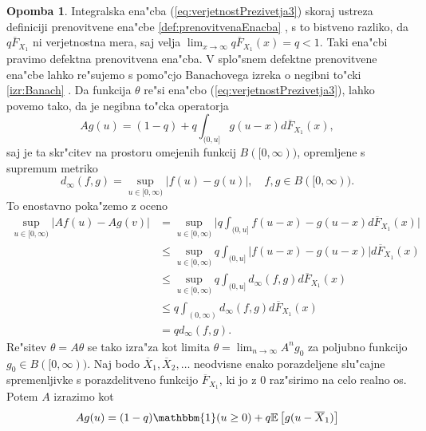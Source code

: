 \documentclass[12pt, a4paper, reqno]{amsart}
\theoremstyle{definition}
\newtheorem{opomba}[definicija]{Opomba}
\theoremstyle{plain}
\newcommand{\E}{\mathbb{E}}
\newcommand{\1}{\mathds{1}}
\newcommand*{\refPriloga}[1]{%
  \begingroup
    \hypersetup{
      linkcolor=red,
      linkbordercolor=red,
    }%
    \ref{#1}%
  \endgroup
}
\begin{document}
    \begin{opomba}
    Integralska ena"cba (\ref{eq:verjetnostPrezivetja3}) skoraj ustreza definiciji prenovitvene ena"cbe
    \refPriloga{def:prenovitvenaEnacba}, s 
    to bistveno razliko, da $q\overline{F}_{X_1}$ ni verjetnostna mera, saj velja 
    $\lim_{x\to\infty}q\overline{F}_{X_1}(x) = q < 1$. Taki ena"cbi pravimo
    defektna prenovitvena ena"cba. V splo"snem defektne prenovitvene ena"cbe lahko re"sujemo s pomo"cjo 
    Banachovega izreka o negibni to"cki \refPriloga{izr:Banach}. Da funkcija $\theta$ re"si ena"cbo 
    (\ref{eq:verjetnostPrezivetja3}), lahko povemo tako, da je negibna to"cka operatorja 
    \begin{equation}
        Ag(u) = (1 - q) + q\int_{(0, u]}g(u - x)d\overline{F}_{X_1}(x),
        \label{eq:operator}
    \end{equation}
    saj je ta skr"citev na prostoru omejenih funkcij $B([0, \infty))$, opremljene s supremum metriko
    \begin{equation*}
        d_\infty(f, g) = \sup_{u\in[0, \infty)}\big|f(u) - g(u)\big|,  \quad f, g\in B([0, \infty)).
    \end{equation*}
    To enostavno poka"zemo z oceno
    \begin{align*}
        \sup_{u\in[0, \infty)}\big|Af(u) - Ag(v)\big| 
                    &= \sup_{u\in[0, \infty)}\bigg|q\int_{(0, u]}f(u- x) - g(u - x)d\overline{F}_{X_1}(x)\bigg| \\
                                &\leq \sup_{u\in[0, \infty)}q\int_{(0, u]}\big|f(u - x) - g(u - x)\big|d\overline{F}_{X_1}(x) \\
                                &\leq \sup_{u\in[0, \infty)}q\int_{(0, u]}d_\infty(f, g)d\overline{F}_{X_1}(x) \\
                                &\leq q\int_{(0, \infty)}d_\infty(f, g)d\overline{F}_{X_1}(x)\\
                                &= qd_\infty(f, g).
    \end{align*}
    Re"sitev $\theta = A\theta$ se tako izra"za kot limita $\theta = \lim_{n\to\infty}A^ng_0$ za 
    poljubno funkcijo $g_0\in B([0, \infty)).$ Naj bodo $\overline{X}_1, \overline{X}_2, \dots $ 
    neodvisne enako porazdeljene slu"cajne spremenljivke s porazdelitveno funkcijo $\overline{F}_{X_1}$, ki 
    jo z $0$ raz"sirimo na celo realno os.
    Potem $A$ izrazimo kot
    \begin{equation*}
        Ag(u) = (1 - q)\mathbbm{1}(u\geq0) + q\E\left[g(u - \overline{X}_1)\right]
    \end{equation*}

\end{opomba}
\end{document}
